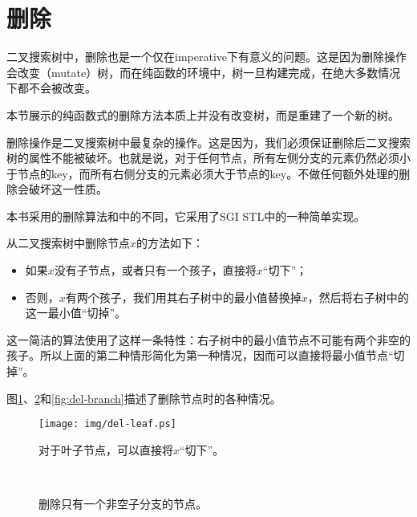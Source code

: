 \documentclass[UTF8]{article}
\begin{document}
\section{删除}
二叉搜索树中，删除也是一个仅在imperative下有意义的问题。这是因为删除操作会改变（mutate）树，而在纯函数的环境中，树一旦构建完成，在绝大多数情况下都不会被改变。

本节展示的纯函数式的删除方法本质上并没有改变树，而是重建了一个新的树。

删除操作是二叉搜索树中最复杂的操作。这是因为，我们必须保证删除后二叉搜索树的属性不能被破坏。也就是说，对于任何节点，所有左侧分支的元素仍然必须小于节点的key，而所有右侧分支的元素必须大于节点的key。不做任何额外处理的删除会破坏这一性质。

本书采用的删除算法和\cite{CLRS}中的不同，它采用了SGI STL中的一种简单实现\cite{sgi-stl}。

从二叉搜索树中删除节点$x$的方法如下：
\begin{itemize}
\item 如果$x$没有子节点，或者只有一个孩子，直接将$x$“切下”；
\item 否则，$x$有两个孩子，我们用其右子树中的最小值替换掉$x$，然后将右子树中的这一最小值“切掉”。
\end{itemize}

这一简洁的算法使用了这样一条特性：右子树中的最小值节点不可能有两个非空的孩子。所以上面的第二种情形简化为第一种情况，因而可以直接将最小值节点“切掉”。

图\ref{fig:del-leaf}、\ref{fig:del-1child}和\ref{fig:del-branch}描述了删除节点时的各种情况。

\begin{figure}[htbp]
  \centering
  \texttt{[image: img/del-leaf.ps]}
  \caption{对于叶子节点，可以直接将$x$“切下”。} \label{fig:del-leaf}
\end{figure}

\begin{figure}[htbp]
  \centering
   \\
  \caption{删除只有一个非空子分支的节点。}
  \label{fig:del-1child}
\end{figure}
\end{document}
